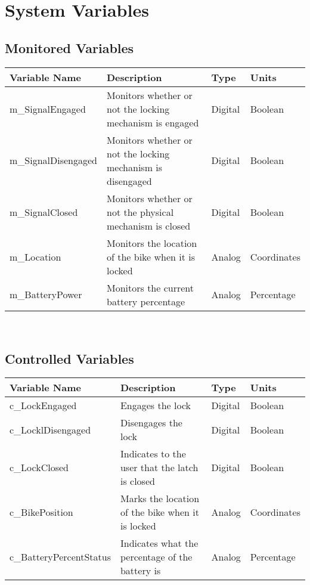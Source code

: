 \documentclass[12pt, titlepage]{article}
\begin{document}
\newpage
\section{System Variables}


\subsection{Monitored Variables}

\begin{minipage}{\textwidth}
\renewcommand*{\arraystretch}{1.5}
\begin{tabular}{| p{} | p{} | p{} | p{} |}
 \hline
 Variable Name & Description & Type & Units \\ 
 \hline
 m\_SignalEngaged & Monitors whether or not the locking mechanism is engaged & Digital & Boolean \\ 
  \hline
 m\_SignalDisengaged & Monitors whether or not the locking mechanism is disengaged & Digital & Boolean \\ 
  \hline
 m\_SignalClosed& Monitors whether or not the physical mechanism is closed & Digital & Boolean \\ 
  \hline
 m\_Location & Monitors the location of the bike when it is locked & Analog & Coordinates \\ 
  \hline
 m\_BatteryPower & Monitors the current battery percentage & Analog & Percentage \\ 
 \hline
\end{tabular}
\end{minipage}\\

\subsection{Controlled Variables}

\begin{minipage}{\textwidth}
\renewcommand*{\arraystretch}{1.5}
\begin{tabular}{| p{} | p{} | p{} | p{} |}
 \hline
 Variable Name & Description & Type & Units \\ 
 \hline
 c\_LockEngaged & Engages the lock & Digital & Boolean \\ 
  \hline
 c\_LocklDisengaged & Disengages the lock & Digital & Boolean \\ 
  \hline
 c\_LockClosed& Indicates to the user that the latch is closed & Digital & Boolean \\ 
  \hline
 c\_BikePosition & Marks the location of the bike when it is locked & Analog & Coordinates \\ 
  \hline
 c\_BatteryPercentStatus & Indicates what the percentage of the battery is & Analog & Percentage \\ 
 \hline
\end{tabular}
\end{minipage}\\
\end{document}
